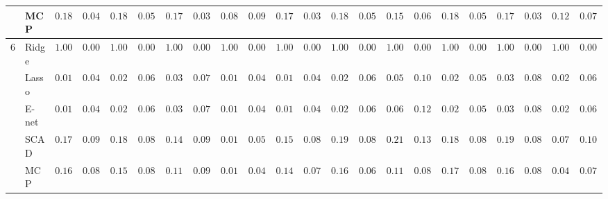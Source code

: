 \begin{tabular}{p{0.2cm}p{1cm}|p{0.6cm}p{0.6cm}|p{0.6cm}p{0.6cm}p{0.6cm}p{0.6cm}p{0.6cm}p{0.6cm}|p{0.6cm}p{0.6cm}p{0.6cm}p{0.6cm}p{0.6cm}p{0.6cm}|p{0.6cm}p{0.6cm}p{0.6cm}p{0.6cm}p{0.6cm}p{0.6cm}}
 & MCP  & $0.1800$ & $0.0454$ & $0.1850$ & $0.0524$ & $0.1700$ & $0.0333$ & $0.0833$ & $0.0902$ & $0.1750$ & $0.0365$ & $0.1883$ & $0.0563$ & $0.1533$ & $0.0656$ & $0.1800$ & $0.0512$ & $0.1733$ & $0.0328$ & $0.1200$ & $0.0789$ \\\hline
6 & Ridge  & $1.0000$ & $0.0000$ & $1.0000$ & $0.0000$ & $1.0000$ & $0.0000$ & $1.0000$ & $0.0000$ & $1.0000$ & $0.0000$ & $1.0000$ & $0.0000$ & $1.0000$ & $0.0000$ & $1.0000$ & $0.0000$ & $1.0000$ & $0.0000$ & $1.0000$ & $0.0000$ \\
 & Lasso  & $0.0133$ & $0.0454$ & $0.0267$ & $0.0658$ & $0.0333$ & $0.0749$ & $0.0117$ & $0.0427$ & $0.0150$ & $0.0479$ & $0.0283$ & $0.0629$ & $0.0517$ & $0.1024$ & $0.0233$ & $0.0581$ & $0.0383$ & $0.0882$ & $0.0233$ & $0.0671$ \\
 & E-net  & $0.0133$ & $0.0454$ & $0.0267$ & $0.0658$ & $0.0333$ & $0.0749$ & $0.0133$ & $0.0454$ & $0.0133$ & $0.0454$ & $0.0283$ & $0.0629$ & $0.0617$ & $0.1223$ & $0.0233$ & $0.0581$ & $0.0350$ & $0.0896$ & $0.0250$ & $0.0686$ \\
 & SCAD  & $0.1733$ & $0.0974$ & $0.1800$ & $0.0876$ & $0.1400$ & $0.0969$ & $0.0167$ & $0.0503$ & $0.1550$ & $0.0829$ & $0.1967$ & $0.0867$ & $0.2100$ & $0.1394$ & $0.1850$ & $0.0883$ & $0.1917$ & $0.0898$ & $0.0733$ & $0.1068$ \\
 & MCP  & $0.1600$ & $0.0851$ & $0.1567$ & $0.0848$ & $0.1100$ & $0.0924$ & $0.0117$ & $0.0427$ & $0.1467$ & $0.0796$ & $0.1683$ & $0.0690$ & $0.1150$ & $0.0810$ & $0.1733$ & $0.0818$ & $0.1667$ & $0.0854$ & $0.0433$ & $0.0735$ \\
\hline 
\end{tabular}

